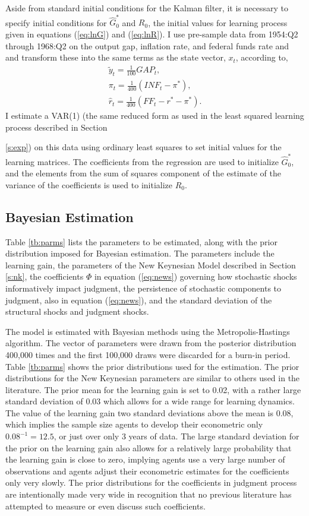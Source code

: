 \documentclass[12pt]{article}
\newcommand{\bdm}{\begin{displaymath}}
\newcommand{\edm}{\end{displaymath}}
\newcommand{\h}[1]{\hat{#1}}
\newcommand{\ds}{\displaystyle}
\begin{document}
Aside from standard initial conditions for the Kalman filter, it is necessary to specify initial conditions for $\h{G}_{0}^{*}$ and $R_{0}$, the initial values for learning process given in equations (\ref{eq:lnG}) and (\ref{eq:lnR}).  I use pre-sample data from 1954:Q2 through 1968:Q2 on the output gap, inflation rate, and federal funds rate and and transform these into the same terms as the state vector, $x_t$, according to,
\bdm \begin{array}{l}
\ds \tilde{y}_t = \frac{1}{100} GAP_t, \\ [1pc]
\ds \pi_t = \frac{1}{400} (INF_t - \pi^{*}), \\ [1pc]
\ds \h{r}_t = \frac{1}{400} (FF_t - r^{*} - \pi^*).
\end{array}
\edm
I estimate a VAR(1) (the same reduced form as used in the least squared learning process described in Section {\ref{s:exp}) on this data using ordinary least squares to set initial values for the learning matrices.  The coefficients from the regression are used to initialize $\h{G}_{0}^{*}$, and the elements from the sum of squares component of the estimate of the variance of the coefficients is used to initialize $R_{0}$.

\subsection{Bayesian Estimation}

Table \ref{tb:parms} lists the parameters to be estimated, along with the prior distribution imposed for Bayesian estimation.  The parameters include the learning gain, the parameters of the New Keynesian Model described in Section \ref{s:nk}, the coefficients $\Phi$ in equation (\ref{eq:news}) governing how stochastic shocks informatively impact judgment, the persistence of stochastic components to judgment, also in equation (\ref{eq:news}), and the standard deviation of the structural shocks and judgment shocks. 

The model is estimated with Bayesian methods using the Metropolis-Hastings algorithm.  The vector of parameters were drawn from the posterior distribution 400,000 times and the first 100,000 draws were discarded for a burn-in period.  Table \ref{tb:parms} shows the prior distributions used for the estimation.  The prior distributions for the New Keynesian parameters are similar to others used in the literature.  The prior mean for the learning gain is set to 0.02, with a rather large standard deviation of 0.03 which allows for a wide range for learning dynamics.  The value of the learning gain two standard deviations above the mean is 0.08, which implies the sample size agents to develop their econometric only $0.08^{-1} = 12.5$, or just over only 3 years of data.  The large standard deviation for the prior on the learning gain also allows for a relatively large probability that the learning gain is close to zero, implying agents use a very large number of observations and agents adjust their econometric estimates for the coefficients only very slowly.  The prior distributions for the coefficients in judgment process are intentionally made very wide in recognition that no previous literature has attempted to measure or even discuss such coefficients.   

}
\end{document}
